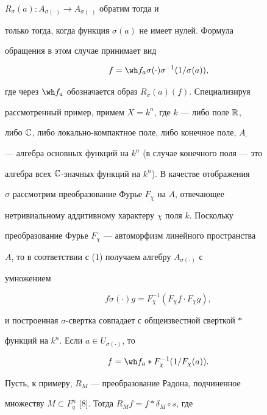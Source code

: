$R_\sigma(a):A_{\sigma(\cdot)}\to A_{\sigma(\cdot)}$ обратим тогда и 


только тогда, когда функция $\sigma(a)$ не имеет нулей. Формула 


обращения в этом случае принимает вид 


$$ 


f=\wh f_a\sigma(\cdot)\sigma^{-1}(1/\sigma(a)), 


$$ 


где через $\wh f_a$ обозначается образ $R_\sigma(a)(f)$. Специализируя 


рассмотренный пример, примем $X=k^n$, где $k$ --- либо поле $\Bbb R$, 


либо $\Bbb C$, либо локально-компактное поле, либо конечное поле, $A_\cdot$ 


--- алгебра основных функций на $k^n$ (в случае конечного поля --- это 


алгебра всех $\Bbb C$-значных функций на $k^n$). В качестве отображения 


$\sigma$ рассмотрим преобразование Фурье $F_\chi$ на $A$, отвечающее 


нетривиальному аддитивному характеру $\chi$ поля $k$. Поскольку 


преобразование Фурье $F_\chi$ --- автоморфизм линейного пространства 


$A$, то в соответствии с (1) получаем алгебру $A_{\sigma(\cdot)}$ с 


умножением 


\begin{equation} 


f\sigma(\cdot)g=F^{-1}_\chi(F_\chi f\cdot F_\chi g), 


\end{equation} 


и построенная $\sigma$-свертка совпадает с общеизвестной сверткой $*$ 


функций на $k^n$. Если $a\in U_{\sigma(\cdot)}$, то 


\begin{equation} 


f=\wh f_a*F^{-1}_\chi(1/F_\chi(a)). 


\end{equation} 


 


Пусть, к примеру, $R_M$ --- преобразование Радона, подчиненное 


множеству $M\subset F^n_q$ [8]. Тогда $R_M f=f*\delta_M\circ s$, где 


